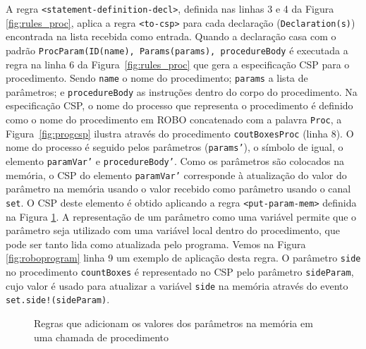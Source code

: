 A regra \texttt{<statement-definition-decl>}, definida nas linhas 3 e 4 da Figura \ref{fig:rules_proc}, aplica a regra \texttt{<to-csp>} para cada declaração (\texttt{Declaration(s)}) encontrada na lista recebida como entrada. 
Quando a declaração casa com o padrão \texttt{ProcParam(ID(name), Params(params), procedureBody} é executada a regra na linha 6 da Figura~\ref{fig:rules_proc} que gera a especificação CSP para o procedimento. Sendo \texttt{name} o nome do procedimento; \texttt{params} a lista de parâmetros; e \texttt{procedureBody} as instruções dentro do corpo do procedimento. Na especificação CSP, o nome do processo que representa o procedimento é definido como o nome do procedimento em ROBO concatenado com a palavra \texttt{Proc}, a Figura~\ref{fig:progcsp} ilustra através do procedimento \texttt{coutBoxesProc} (linha 8). O nome do processo é seguido pelos parâmetros (\texttt{params'}), o símbolo de igual, o elemento \texttt{paramVar'} e \texttt{procedureBody'}. Como os parâmetros são colocados na memória, o CSP do elemento \texttt{paramVar'} corresponde à atualização do valor do parâmetro na memória usando o valor recebido como parâmetro usando o canal \texttt{set}. O CSP deste elemento é obtido aplicando a regra \texttt{<put-param-mem>} definida na Figura \ref{fig:put_proc}. A representação de um parâmetro como uma variável permite que o parâmetro seja utilizado com uma variável local dentro do procedimento, que pode ser tanto lida como atualizada pelo programa. 
Vemos na Figura \ref{fig:roboprogram} linha 9 um exemplo de aplicação desta regra. O parâmetro \texttt{side} no procedimento \texttt{countBoxes} é representado no  CSP pelo parâmetro \texttt{sideParam}, cujo valor é usado para atualizar a variável \texttt{side} na memória através do evento \texttt{set.side!(sideParam)}.

\begin{figure}[!h]
\centering
\caption{Regras que adicionam os valores dos parâmetros na memória em uma chamada de procedimento}

\label{fig:put_proc}
\end{figure}

